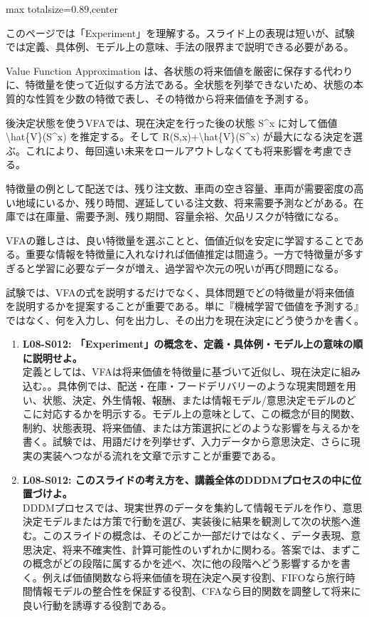 \begin{minipage}[t]{0.58\textwidth}
\begin{adjustbox}{max totalsize={\textwidth}{0.89\textheight},center}
\begin{minipage}{\textwidth}\scriptsize
{}このページでは「Experiment」を理解する。スライド上の表現は短いが、試験では定義、具体例、モデル上の意味、手法の限界まで説明できる必要がある。\par
Value Function Approximation は、各状態の将来価値を厳密に保存する代わりに、特徴量を使って近似する方法である。全状態を列挙できないため、状態の本質的な性質を少数の特徴で表し、その特徴から将来価値を予測する。\par
後決定状態を使うVFAでは、現在決定を行った後の状態 S\textasciicircum{}x に対して価値 \textbackslash{}hat\{V\}(S\textasciicircum{}x) を推定する。そして R(S,x)+\textbackslash{}hat\{V\}(S\textasciicircum{}x) が最大になる決定を選ぶ。これにより、毎回遠い未来をロールアウトしなくても将来影響を考慮できる。\par
特徴量の例として配送では、残り注文数、車両の空き容量、車両が需要密度の高い地域にいるか、残り時間、遅延している注文数、将来需要予測などがある。在庫では在庫量、需要予測、残り期間、容量余裕、欠品リスクが特徴になる。\par
VFAの難しさは、良い特徴量を選ぶことと、価値近似を安定に学習することである。重要な情報を特徴量に入れなければ価値推定は間違う。一方で特徴量が多すぎると学習に必要なデータが増え、過学習や次元の呪いが再び問題になる。\par
試験では、VFAの式を説明するだけでなく、具体問題でどの特徴量が将来価値を説明するかを提案することが重要である。単に『機械学習で価値を予測する』ではなく、何を入力し、何を出力し、その出力を現在決定にどう使うかを書く。\par{}\begin{enumerate}\item \textbf{L08-S012: 「Experiment」の概念を、定義・具体例・モデル上の意味の順に説明せよ。}\\定義としては、VFAは将来価値を特徴量に基づいて近似し、現在決定に組み込む。。具体例では、配送・在庫・フードデリバリーのような現実問題を用い、状態、決定、外生情報、報酬、または情報モデル/意思決定モデルのどこに対応するかを明示する。モデル上の意味として、この概念が目的関数、制約、状態表現、将来価値、または方策選択にどのような影響を与えるかを書く。試験では、用語だけを列挙せず、入力データから意思決定、さらに現実の実装へつながる流れを文章で示すことが重要である。\item \textbf{L08-S012: このスライドの考え方を、講義全体のDDDMプロセスの中に位置づけよ。}\\DDDMプロセスでは、現実世界のデータを集約して情報モデルを作り、意思決定モデルまたは方策で行動を選び、実装後に結果を観測して次の状態へ進む。このスライドの概念は、そのどこか一部だけではなく、データ表現、意思決定、将来不確実性、計算可能性のいずれかに関わる。答案では、まずこの概念がどの段階に属するかを述べ、次に他の段階へどう影響するかを書く。例えば価値関数なら将来価値を現在決定へ戻す役割、FIFOなら旅行時間情報モデルの整合性を保証する役割、CFAなら目的関数を調整して将来に良い行動を誘導する役割である。\end{enumerate}

\end{minipage}
\end{adjustbox}
\end{minipage}
